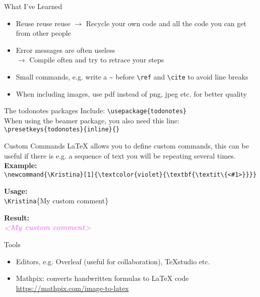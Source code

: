 \documentclass[11pt,t,usepdftitle=false,aspectratio=169]{beamer}
\newcommand{\Kristina}[1]{\textcolor{violet}{\textbf{\textit{<#1>}}}}
\begin{document}
\begin{frame}{What I've Learned}
	\begin{itemize}
		\item Reuse reuse reuse $\rightarrow$ Recycle your own code and all the code you can get from other people 
		\item Error messages are often useless \\
		$\rightarrow$ Compile often and try to retrace your steps 
		\item Small commands, e.g. write a \textasciitilde{} before \texttt{\textbackslash{}ref} and \texttt{\textbackslash{}cite} to avoid line breaks 
		\item When including images, use pdf instead of png, jpeg etc. for better quality 
	\end{itemize}
	
\end{frame}


\begin{frame}{The todonotes packages}
	Include: \texttt{\textbackslash{}usepackage\{todonotes\}} \\
	When using the beamer package, you also need this line: \\
	\texttt{\textbackslash{}presetkeys\{todonotes\}\{inline\}\{\}}
	
\end{frame}



\begin{frame}{Custom Commands}
	LaTeX allows you to define custom commands, this can be useful if there is e.g. a sequence of text you will be repeating several times. \\ \medskip 
	\textbf{Example:} \\ \texttt{\textbackslash{}newcommand\{\textbackslash{}Kristina\}[1]\{\textbackslash{}textcolor\{violet\}\{\textbackslash{}textbf\{\textbackslash{}textit\textbackslash{}\{<\#1>\}\}\}\}} \\  \medskip
	
	\textbf{Usage:} \\
	\texttt{\textbackslash{}Kristina}\{My custom comment\} \\ \medskip
	
	\textbf{Result:} \\ 
	\Kristina{My custom comment}
\end{frame}


\begin{frame}{Tools}
	\begin{itemize}
		\item Editors, e.g. Overleaf (useful for collaboration), TeXstudio etc. 
		\item Mathpix: converts handwritten formulas to LaTeX code \url{https://mathpix.com/image-to-latex}
	\end{itemize}

\end{frame}
\end{document}
